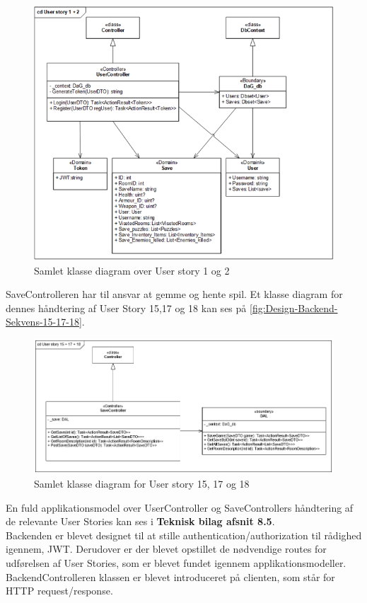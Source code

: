 \begin{figure}[H]
\centering
\includegraphics[width = \textwidth]{02-Body/Images/Backend_klasse_1_2.PNG}
\caption{Samlet klasse diagram over User story 1 og 2}
\label{fig:Design-Backend-Klasse-1-2}
\end{figure}

\noindent SaveControlleren har til ansvar at gemme og hente spil. Et klasse diagram for dennes håndtering af User Story 15,17 og 18 kan ses på \autoref{fig:Design-Backend-Sekvens-15-17-18}.\\


\begin{figure}[H]
\centering
\includegraphics[width = \textwidth]{02-Body/Images/Backend_klasse_15_17_18.PNG}
\caption{Samlet klasse diagram for User story 15, 17 og 18}
\label{fig:Design-Backend-Sekvens-15-17-18}
\end{figure}

\noindent En fuld applikationsmodel over UserController og SaveControllers håndtering af de relevante User Stories kan ses i \textbf{Teknisk bilag afsnit 8.5}.\\

Backenden er blevet designet til at stille authentication/authorization til rådighed igennem, JWT. Derudover er der blevet opstillet de nødvendige routes for udførelsen af User Stories, som er blevet fundet igennem applikationsmodeller. BackendControlleren klassen er blevet introduceret på clienten, som står for HTTP request/response.\\ 


\newpage
